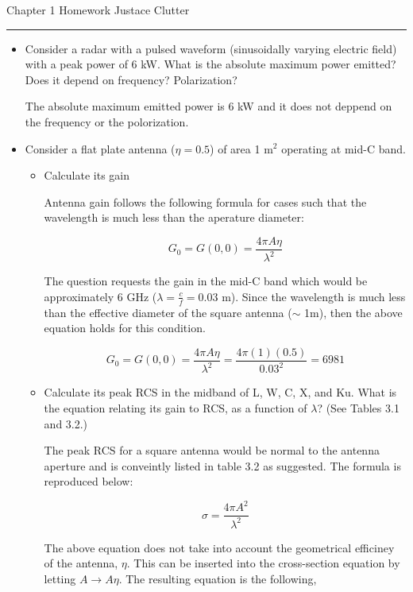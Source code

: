 \documentclass[letterpaper,10pt]{article}\usepackage[]{graphicx}\usepackage[]{color}
\newcommand{\question}[3]{
\begin{itemize}
\item[{\makebox[1cm]{#1)}}] #2

\vspace{.2in}

#3

\end{itemize}

\vspace{.2in}
}
\begin{document}
{\large Chapter 1 Homework}
\hfill
{\large Justace Clutter}

\vspace{.1in}

\hrule

\vspace{.5in}

\question{1.1}
{Consider a radar with a pulsed waveform (sinusoidally varying electric field) with a peak power of 6 kW.  What is the absolute maximum power emitted? Does it depend on frequency? Polarization?}
{
The absolute maximum emitted power is 6 kW and it does not deppend on the frequency or the polorization.
}

\question{1.2}
{Consider a flat plate antenna ($\eta=0.5$) of area 1 m$^2$ operating at mid-C band.}
{
\question{a}{Calculate its gain}
{

Antenna gain follows the following formula for cases such that the wavelength is much less than the aperature diameter:

\begin{equation*}
G_0 = G(0,0) = \frac{4\pi A\eta}{\lambda^2}
\end{equation*}

The question requests the gain in the mid-C band which would be approximately 6 GHz ($\lambda = \frac{c}{f} = 0.03$ m).  Since the wavelength is much less than the effective diameter of the square antenna ($\sim$ 1m), then the above equation holds for this condition.

\begin{equation*}
G_0 = G(0,0) = \frac{4\pi A\eta}{\lambda^2} = \frac{4\pi(1)(0.5)}{0.03^2} = 6981
\end{equation*}
}

\question{b}{Calculate its peak RCS in the midband of L, W, C, X, and Ku. What is the equation relating its gain to RCS, as a function of $\lambda$? (See Tables 3.1 and 3.2.)}{

The peak RCS for a square antenna would be normal to the antenna aperture and is conveintly listed in table 3.2 as suggested.  The formula is reproduced below:

\begin{equation*}
\sigma = \frac{4\pi A^2}{\lambda^2}
\end{equation*}

The above equation does not take into account the geometrical efficiney of the antenna, $\eta$.  This can be inserted into the cross-section equation by letting $A\rightarrow A\eta$.  The resulting equation is the following,

}}
\end{document}
